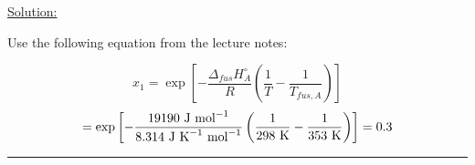 \noindent
\underline{Solution:}

Use the following equation from the lecture notes:

$$x_1 = \exp\left[-\frac{\Delta_{fus}H_A^\circ}{R}\left(\frac{1}{T} - \frac{1}{T_{fus,A}}\right)\right]$$
$$= \exp\left[-\frac{19190\textnormal{ J mol}^{-1}}{8.314\textnormal{ J K}^{-1}\textnormal{ mol}^{-1}}\left(\frac{1}{298\textnormal{ K}} - \frac{1}{353\textnormal{ K}}\right)\right] = 0.3$$

\hrule\vspace{0.5cm}
